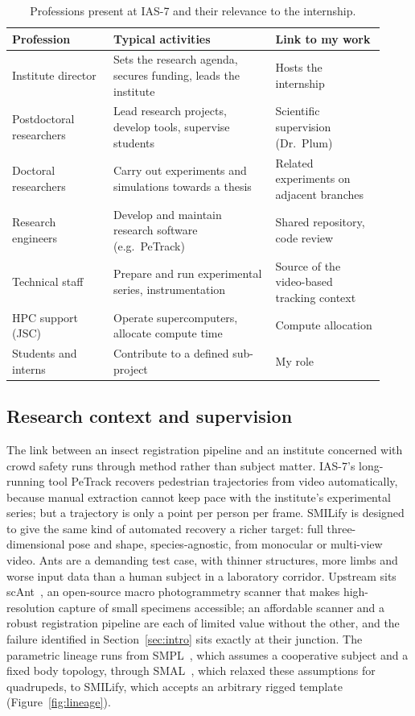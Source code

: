 \begin{table}[!htb]
\centering
\caption{Professions present at IAS-7 and their relevance to the internship.}
\label{tab:roles}
\begin{tabular}{@{}L{0.25\linewidth}L{0.40\linewidth}L{0.27\linewidth}@{}}
\toprule
\textbf{Profession} & \textbf{Typical activities} & \textbf{Link to my work}\\
\midrule
Institute director & Sets the research agenda, secures funding, leads the
 institute & Hosts the internship\\
Postdoctoral researchers & Lead research projects, develop tools, supervise
 students & Scientific supervision (Dr.\ Plum)\\
Doctoral researchers & Carry out experiments and simulations towards a
 thesis & Related experiments on adjacent branches\\
Research engineers & Develop and maintain research software (e.g.\ PeTrack) &
 Shared repository, code review\\
Technical staff & Prepare and run experimental series, instrumentation &
 Source of the video-based tracking context\\
HPC support (JSC) & Operate supercomputers, allocate compute time & Compute
 allocation\\
Students and interns & Contribute to a defined sub-project & My role\\
\bottomrule
\end{tabular}
\end{table}

\subsection{Research context and supervision}

The link between an insect registration pipeline and an institute concerned
with crowd safety runs through method rather than subject matter. IAS-7's
long-running tool PeTrack recovers pedestrian trajectories from video
automatically, because manual extraction cannot keep pace with the institute's
experimental series; but a trajectory is only a point per person per frame.
SMILify is designed to give the same kind of automated recovery a richer
target: full three-dimensional pose and shape, species-agnostic, from
monocular or multi-view video. Ants are a demanding test case, with thinner
structures, more limbs and worse input data than a human subject in a
laboratory corridor. Upstream sits scAnt~\cite{scant}, an open-source macro
photogrammetry scanner that makes high-resolution capture of small specimens
accessible; an affordable scanner and a robust registration pipeline are each
of limited value without the other, and the failure identified in
Section~\ref{sec:intro} sits exactly at their junction. The parametric lineage
runs from SMPL~\cite{smpl}, which assumes a cooperative subject and a fixed
body topology, through SMAL~\cite{smal}, which relaxed these assumptions for
quadrupeds, to SMILify, which accepts an arbitrary rigged template
(Figure~\ref{fig:lineage}).

